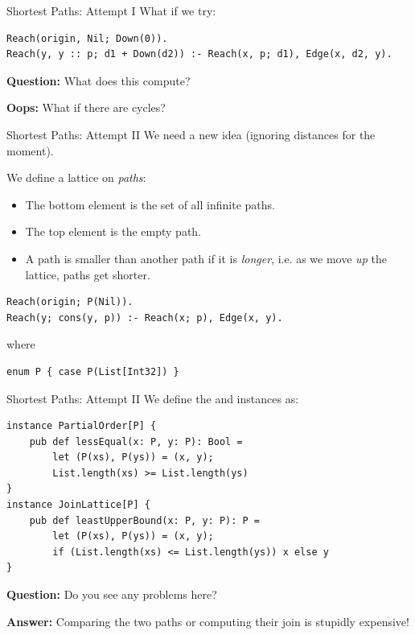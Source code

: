 \begin{frame}[fragile]{Shortest Paths: Attempt I}
What if we try:

\begin{lstlisting}[language=flix, xleftmargin=0.8cm]
Reach(origin, Nil; Down(0)).
Reach(y, y :: p; d1 + Down(d2)) :- Reach(x, p; d1), Edge(x, d2, y).
\end{lstlisting}

\textbf{Question:} What does this compute?

\pause

\textbf{Oops:} What if there are cycles?
\end{frame}
    
\begin{frame}[fragile]{Shortest Paths: Attempt II}
We need a new idea (ignoring distances for the moment).

We define a lattice on \emph{paths}:

\begin{itemize}
    \item The bottom element is the set of all infinite paths.
    \pause \item The top element is the empty path.
    \pause \item A path is smaller than another path if it is \emph{longer}, i.e. as we
    move \emph{up} the lattice, paths get shorter. 
\end{itemize}

\pause

\begin{lstlisting}[language=flix, xleftmargin=0.8cm]
Reach(origin; P(Nil)).
Reach(y; cons(y, p)) :- Reach(x; p), Edge(x, y).
\end{lstlisting}

where

\begin{lstlisting}[language=flix, xleftmargin=0.8cm]
enum P { case P(List[Int32]) }
\end{lstlisting}
\end{frame}

\begin{frame}[fragile]{Shortest Paths: Attempt II}
We define the  and  instances as:

\begin{lstlisting}[language=flix, xleftmargin=0.8cm]
instance PartialOrder[P] {
    pub def lessEqual(x: P, y: P): Bool = 
        let (P(xs), P(ys)) = (x, y);
        List.length(xs) >= List.length(ys)
}
instance JoinLattice[P] {
    pub def leastUpperBound(x: P, y: P): P = 
        let (P(xs), P(ys)) = (x, y);
        if (List.length(xs) <= List.length(ys)) x else y
}
\end{lstlisting}

\pause

\textbf{Question:} Do you see any problems here?

\pause

\textbf{Answer:} Comparing the two paths or computing their join is stupidly expensive!
\end{frame}

